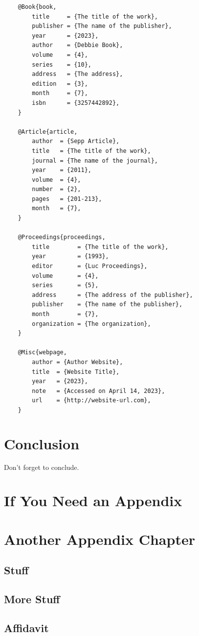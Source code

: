 \documentclass[12pt,final,a4paper,oneside]{book}
\begin{document}
{\begin{verbatim}
	@Book{book,
		title     = {The title of the work},
		publisher = {The name of the publisher},
		year      = {2023},
		author    = {Debbie Book},
		volume    = {4},
		series    = {10},
		address   = {The address},
		edition   = {3},
		month     = {7},
		isbn      = {3257442892},
	}
	
	@Article{article,
		author  = {Sepp Article},
		title   = {The title of the work},
		journal = {The name of the journal},
		year    = {2011},
		volume  = {4},
		number  = {2},
		pages   = {201-213},
		month   = {7},
	}
	
	@Proceedings{proceedings,
		title        = {The title of the work},
		year         = {1993},
		editor       = {Luc Proceedings},
		volume       = {4},
		series       = {5},
		address      = {The address of the publisher},
		publisher    = {The name of the publisher},
		month        = {7},
		organization = {The organization},
	}
	
	@Misc{webpage,
		author = {Author Website},
		title  = {Website Title},
		year   = {2023},
		note   = {Accessed on April 14, 2023},
		url    = {http://website-url.com},
	}
\end{verbatim}
}

\chapter{Conclusion}

Don't forget to conclude.


	

\appendix

\chapter{If You Need an Appendix}

\chapter{Another Appendix Chapter}
\section{Stuff}	
\section{More Stuff}

\clearpage
\section*{Affidavit}
\end{document}
